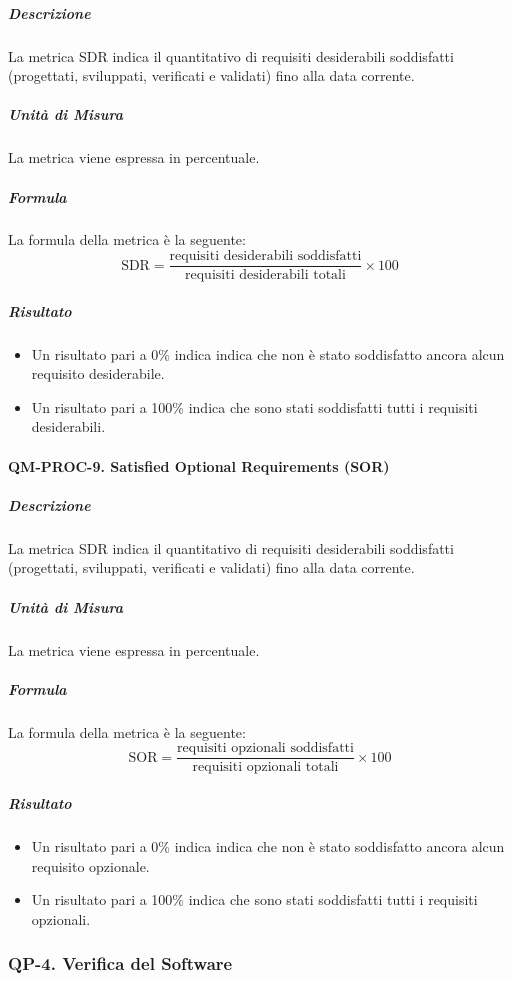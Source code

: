 			\subparagraph{Descrizione}
			La metrica SDR indica il quantitativo di requisiti desiderabili soddisfatti (progettati, sviluppati, verificati e validati) fino alla data corrente.

			\subparagraph{Unità di Misura}
			La metrica viene espressa in percentuale.

			\subparagraph{Formula}
			La formula della metrica è la seguente:
			\[
				\text{SDR} = \frac{\text{requisiti desiderabili soddisfatti}}{\text{requisiti desiderabili totali}} \times 100
			\]

			\subparagraph{Risultato}
			\begin{itemize}
				\item Un risultato pari a 0\% indica indica che non è stato soddisfatto ancora alcun requisito desiderabile.
				\item Un risultato pari a 100\% indica che sono stati soddisfatti tutti i requisiti desiderabili.
			\end{itemize}

		\paragraph{QM-PROC-9. Satisfied Optional Requirements (SOR)}

			\subparagraph{Descrizione}
			La metrica SDR indica il quantitativo di requisiti desiderabili soddisfatti (progettati, sviluppati, verificati e validati) fino alla data corrente.

			\subparagraph{Unità di Misura}
			La metrica viene espressa in percentuale.

			\subparagraph{Formula}
			La formula della metrica è la seguente:
			\[
				\text{SOR} = \frac{\text{requisiti opzionali soddisfatti}}{\text{requisiti opzionali totali}} \times 100
			\]

			\subparagraph{Risultato}
			\begin{itemize}
				\item Un risultato pari a 0\% indica indica che non è stato soddisfatto ancora alcun requisito opzionale.
				\item Un risultato pari a 100\% indica che sono stati soddisfatti tutti i requisiti opzionali.
			\end{itemize}

	\subsubsection{QP-4. Verifica del Software}

